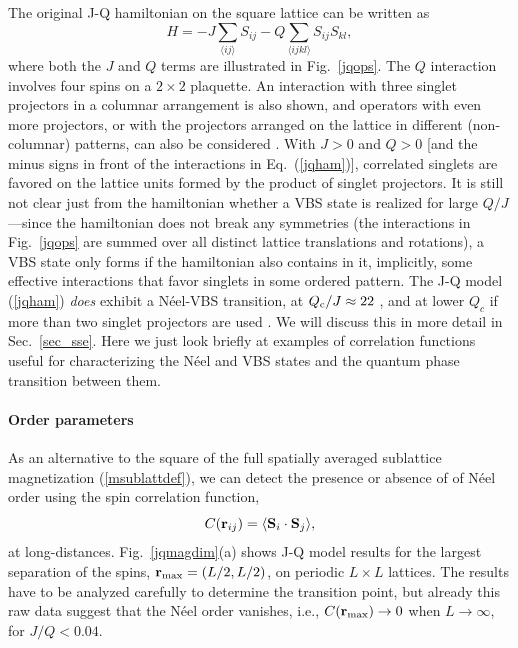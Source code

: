 \documentclass[draft,numberedheadings]{aipproc}
\begin{document}
The original J-Q hamiltonian \cite{sandvik1} on the square lattice can be written as
\begin{equation}
H = -J\sum_{\langle ij\rangle}S_{ij} -Q\sum_{\langle ijkl\rangle}S_{ij}S_{kl},
\label{jqham}
\end{equation}
where both the $J$ and $Q$ terms are illustrated in Fig.~\ref{jqops}. The $Q$ interaction involves four spins on a $2\times 2$ plaquette. An interaction 
with three singlet projectors in a columnar arrangement is also shown, and operators with even more projectors, or with the projectors arranged on the lattice 
in different (non-columnar) patterns, can also be considered \cite{arnab}. With $J>0$ and $Q>0$ [and the minus signs in front of the interactions in 
Eq.~(\ref{jqham})], correlated singlets are favored on the lattice units formed by the product of singlet projectors. It is still not clear just from the 
hamiltonian whether a VBS state is realized for large $Q/J$---since the hamiltonian does not break any symmetries (the interactions in Fig.~\ref{jqops} are 
summed over all distinct lattice translations and rotations), a VBS state only forms if the hamiltonian also contains in it, implicitly, some effective 
interactions that favor singlets in some ordered pattern. The J-Q model (\ref{jqham}) {\it does} exhibit a N\'eel-VBS transition, at $Q_{\rm c}/J\approx 22$ 
\cite{sandvik1,lou1,sandviklogs}, and at lower $Q_c$ if more than two singlet projectors are used \cite{lou1,arnab}. We will discuss this in more detail in 
Sec.~\ref{sec_sse}. Here we just look briefly at examples of correlation functions useful for characterizing the N\'eel and VBS states and the quantum 
phase transition between them. 

\paragraph{Order parameters}

As an alternative to the square of the full spatially averaged sublattice magnetization (\ref{msublattdef}), 
we can detect the presence or absence of of N\'eel order using the spin correlation function,
\begin{equation}
C({\bf r}_{ij}) = \langle {\bf S}_i \cdot {\bf S}_j\rangle,
\end{equation}
at long-distances. Fig.~\ref{jqmagdim}(a) shows J-Q model results for the largest separation of the spins, ${\bf r}_{\rm max}=(L/2,L/2)$, on periodic $L\times L$ 
lattices. The results have to be analyzed carefully to determine the transition point, but already this raw data suggest that the N\'eel order vanishes, i.e., 
$C({\bf r}_{\rm max}) \to 0$ when $L \to \infty$, for $J/Q<0.04$.
\end{document}
